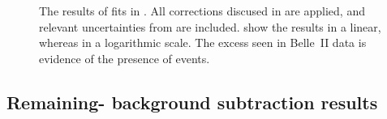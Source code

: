 \begin{figure}[htbp!]
    \centering
    \caption{\label{fig:final_fit_results}
        The results of fits in .
        All corrections discused in  are applied, 
        and relevant uncertainties from  are included.
         show the results in a linear, whereas  in a logarithmic scale.
        The excess seen in Belle~II data is evidence of the presence of \BtoXsdgamma events.
    }
\end{figure}

\subsection{Remaining-\texorpdfstring{\BB}{BB} background subtraction results}\label{sec:background_subtraction_results}

